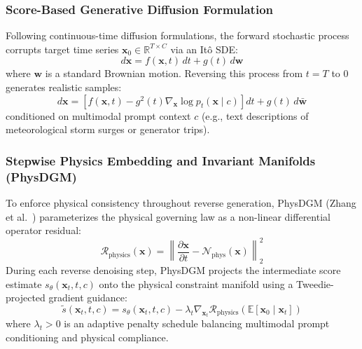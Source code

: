 \subsubsection{Score-Based Generative Diffusion Formulation}
Following continuous-time diffusion formulations, the forward stochastic process corrupts target time series $\mathbf{x}_0 \in \mathbb{R}^{T \times C}$ via an It\^o SDE:
\begin{equation}
    d\mathbf{x} = f(\mathbf{x}, t) \, dt + g(t) \, d\mathbf{w}
\end{equation}
where $\mathbf{w}$ is a standard Brownian motion. Reversing this process from $t=T$ to $0$ generates realistic samples:
\begin{equation}
    d\mathbf{x} = \left[ f(\mathbf{x}, t) - g^2(t) \nabla_{\mathbf{x}} \log p_t(\mathbf{x} \mid c) \right] dt + g(t) \, d\bar{\mathbf{w}}
\end{equation}
conditioned on multimodal prompt context $c$ (e.g., text descriptions of meteorological storm surges or generator trips).

\subsubsection{Stepwise Physics Embedding and Invariant Manifolds (PhysDGM)}
To enforce physical consistency throughout reverse generation, PhysDGM (Zhang et al.~\cite{Zhang2026PhysDGM}) parameterizes the physical governing law as a non-linear differential operator residual:
\begin{equation}
    \mathcal{R}_{\text{physics}}(\mathbf{x}) = \left\| \frac{\partial \mathbf{x}}{\partial t} - \mathcal{N}_{\text{phys}}(\mathbf{x}) \right\|_2^2
\end{equation}
During each reverse denoising step, PhysDGM projects the intermediate score estimate $s_\theta(\mathbf{x}_t, t, c)$ onto the physical constraint manifold using a Tweedie-projected gradient guidance:
\begin{equation}
    \tilde{s}(\mathbf{x}_t, t, c) = s_\theta(\mathbf{x}_t, t, c) - \lambda_t \nabla_{\mathbf{x}_t} \mathcal{R}_{\text{physics}}\left(\mathbb{E}[\mathbf{x}_0 \mid \mathbf{x}_t]\right)
\end{equation}
where $\lambda_t > 0$ is an adaptive penalty schedule balancing multimodal prompt conditioning and physical compliance.

